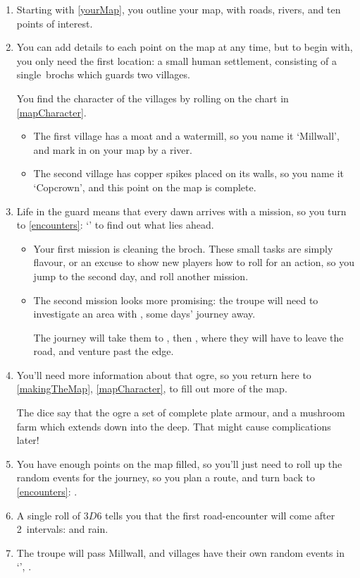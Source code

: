 \begin{multicols}{2}

\begin{enumerate}
  \item
  Starting with \autoref{yourMap}, you outline your map, with roads, rivers, and ten points of interest.
  \item
  You can add details to each point on the map at any time, but to begin with, you only need the first location: a small human settlement, consisting of a single~\glspl{broch} which guards two \glspl{village}.

  You find the character of the \glspl{village} by rolling on the chart in \autoref{mapCharacter}.
  \begin{itemize}
    \item
    The first \gls{village} has a moat and a watermill, so you name it `Millwall', and mark in on your map by a river.
    \item
    The second \gls{village} has copper spikes placed on its walls, so you name it `Copcrown', and this point on the map is complete.
  \end{itemize}
  \item
  Life in the \gls{guard} means that every dawn arrives with a mission, so you turn to \autoref{encounters}: `' to find out what lies ahead.
  \begin{itemize}
    \item
    Your first mission is cleaning the \gls{broch}.
    These small tasks are simply flavour, or an excuse to show new players how to roll for an action, so you jump to the second day, and roll another mission.
    \item
    The second mission looks more promising: the troupe will need to investigate an area with , some days' \gls{journey} away.

    The journey will take them to , then , where they will have to leave the road, and venture past the \gls{edge}.
  \end{itemize}
  \item
  You'll need more information about that \gls{ogre}, so you return here to \autoref{makingTheMap}, \autoref{mapCharacter}, to fill out more of the map.

  The dice say that the \gls{ogre} a set of complete plate armour, and a mushroom farm which extends down into the \gls{deep}.
  That might cause complications later!
  \item
  You have enough points on the map filled, so you'll just need to roll up the random events for the journey, so you plan a route, and turn back to \autoref{encounters}: .
  \item
  A single roll of $3D6$ tells you that the first road-encounter will come after 2~\glspl{interval}:  and rain.
  \item
  The troupe will pass Millwall, and \Glspl{village} have their own random events in `', .


\end{enumerate}
\end{multicols}
